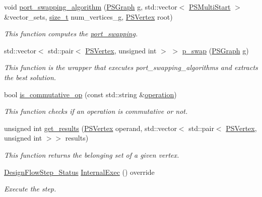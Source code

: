 \begin{DoxyCompactItemize}
void \hyperlink{classport__swapping_a0abef9594eed32fbbc61a0f798265145}{port\+\_\+swapping\+\_\+algorithm} (\hyperlink{classport__swapping_a77c6a219f0b86bd9340d8354e3fff755}{P\+S\+Graph} g, std\+::vector$<$ \hyperlink{structport__swapping_1_1PSMultiStart}{P\+S\+Multi\+Start} $>$ \&vector\+\_\+sets, \hyperlink{tutorial__fpt__2017_2intro_2sixth_2test_8c_a7c94ea6f8948649f8d181ae55911eeaf}{size\+\_\+t} num\+\_\+vertices\+\_\+g, \hyperlink{classport__swapping_a9588366dd46f9f32aab2c8de93d5679f}{P\+S\+Vertex} root)
\begin{DoxyCompactList}\small\item\em This function computes the \hyperlink{classport__swapping}{port\+\_\+swapping}. \end{DoxyCompactList}\item 
std\+::vector$<$ std\+::pair$<$ \hyperlink{classport__swapping_a9588366dd46f9f32aab2c8de93d5679f}{P\+S\+Vertex}, unsigned int $>$ $>$ \hyperlink{classport__swapping_a9ea23faf1a55cdaa0ce699aa5f40086d}{p\+\_\+swap} (\hyperlink{classport__swapping_a77c6a219f0b86bd9340d8354e3fff755}{P\+S\+Graph} g)
\begin{DoxyCompactList}\small\item\em This function is the wrapper that executes port\+\_\+swapping\+\_\+algorithms and extracts the best solution. \end{DoxyCompactList}\item 
bool \hyperlink{classport__swapping_ad546fd3baa65c843d4cf7619cc666cb7}{is\+\_\+commutative\+\_\+op} (const std\+::string \&\hyperlink{structoperation}{operation})
\begin{DoxyCompactList}\small\item\em This function checks if an operation is commutative or not. \end{DoxyCompactList}\item 
unsigned int \hyperlink{classport__swapping_a88d48f0586c1c2e0cfa54708f8b28fea}{get\+\_\+results} (\hyperlink{classport__swapping_a9588366dd46f9f32aab2c8de93d5679f}{P\+S\+Vertex} operand, std\+::vector$<$ std\+::pair$<$ \hyperlink{classport__swapping_a9588366dd46f9f32aab2c8de93d5679f}{P\+S\+Vertex}, unsigned int $>$$>$ results)
\begin{DoxyCompactList}\small\item\em This function returns the belonging set of a given vertex. \end{DoxyCompactList}\item 
\hyperlink{design__flow__step_8hpp_afb1f0d73069c26076b8d31dbc8ebecdf}{Design\+Flow\+Step\+\_\+\+Status} \hyperlink{classport__swapping_afb48fd23dc4e2bc8f38fe50a4cc9f0e5}{Internal\+Exec} () override
\begin{DoxyCompactList}\small\item\em Execute the step. \end{DoxyCompactList}\end{DoxyCompactItemize}

